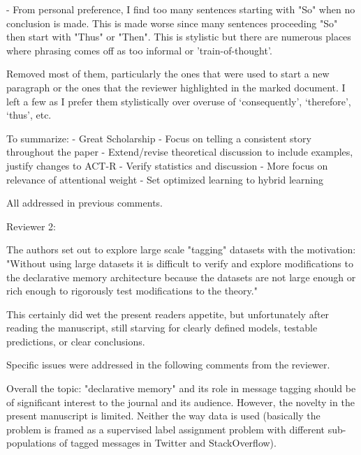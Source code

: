 \documentclass[answers,12pt]{exam}
\begin{document}
\begin{questions}
\question - From personal preference, I find too many sentences starting with "So" when no conclusion is made. This is made worse since many sentences proceeding "So" then start with "Thus" or "Then". This is stylistic but there are numerous places where phrasing comes off as too informal or 'train-of-thought'. 

\begin{solution}
Removed most of them, particularly the ones that were used to start a new paragraph or the ones that the reviewer highlighted in the marked document. I left a few as I prefer them stylistically over overuse of ‘consequently’, ‘therefore’, ‘thus’, etc.
\end{solution}

\question To summarize:
- Great Scholarship
- Focus on telling a consistent story throughout the paper
- Extend/revise theoretical discussion to include examples, justify changes to ACT-R
- Verify statistics and discussion
- More focus on relevance of attentional weight
- Set optimized learning to hybrid learning

\begin{solution}
All addressed in previous comments.
\end{solution}


Reviewer 2: 

\question The authors set out to explore large scale "tagging" datasets with the motivation: "Without using large datasets it is difficult to verify and explore modifications to the declarative memory architecture because the datasets are not large enough or rich enough to rigorously test modifications to the theory."

This certainly did wet the present readers appetite, but unfortunately after reading the manuscript, still starving for clearly defined models, testable predictions, or clear conclusions. 

\begin{solution}
  Specific issues were addressed in the following comments from the reviewer.
\end{solution}

\question Overall the topic: "declarative memory" and its role in message tagging should be of significant interest to the journal and its audience. However, the novelty in the present manuscript is limited. Neither the way data is used (basically the problem is framed as a supervised label assignment problem with different sub-populations of tagged messages in Twitter and StackOverflow). 


\end{questions}
\end{document}
